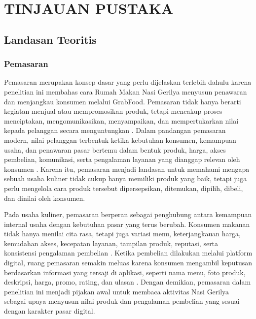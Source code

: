 \chapter{TINJAUAN PUSTAKA}

\section{Landasan Teoritis}
\subsection{Pemasaran}
Pemasaran merupakan konsep dasar yang perlu dijelaskan terlebih dahulu karena penelitian ini membahas cara Rumah Makan Nasi Gerilya menyusun penawaran dan menjangkau konsumen melalui GrabFood. Pemasaran tidak hanya berarti kegiatan menjual atau mempromosikan produk, tetapi mencakup proses menciptakan, mengomunikasikan, menyampaikan, dan mempertukarkan nilai kepada pelanggan secara menguntungkan \parencite{kotler2023principlesmarketing}. Dalam pandangan pemasaran modern, nilai pelanggan terbentuk ketika kebutuhan konsumen, kemampuan usaha, dan penawaran pasar bertemu dalam bentuk produk, harga, akses pembelian, komunikasi, serta pengalaman layanan yang dianggap relevan oleh konsumen \parencite{kotler2023principlesmarketing,wirtz2024servicesmarketing}. Karena itu, pemasaran menjadi landasan untuk memahami mengapa sebuah usaha kuliner tidak cukup hanya memiliki produk yang baik, tetapi juga perlu mengelola cara produk tersebut dipersepsikan, ditemukan, dipilih, dibeli, dan dinilai oleh konsumen.

Pada usaha kuliner, pemasaran berperan sebagai penghubung antara kemampuan internal usaha dengan kebutuhan pasar yang terus berubah. Konsumen makanan tidak hanya menilai cita rasa, tetapi juga variasi menu, keterjangkauan harga, kemudahan akses, kecepatan layanan, tampilan produk, reputasi, serta konsistensi pengalaman pembelian \parencite{regina2025kuliner,sophia2025rendanggadih,wirtz2024servicesmarketing}. Ketika pembelian dilakukan melalui platform digital, ruang pemasaran semakin meluas karena konsumen mengambil keputusan berdasarkan informasi yang tersaji di aplikasi, seperti nama menu, foto produk, deskripsi, harga, promo, rating, dan ulasan \parencite{sophia2025rendanggadih,khairani2022buahsayur,suharjo2020bogorsnacks}. Dengan demikian, pemasaran dalam penelitian ini menjadi pijakan awal untuk membaca aktivitas Nasi Gerilya sebagai upaya menyusun nilai produk dan pengalaman pembelian yang sesuai dengan karakter pasar digital.

